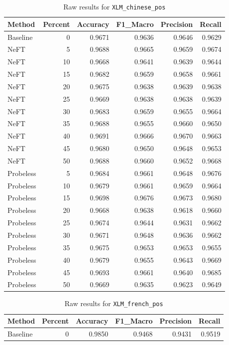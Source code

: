 \documentclass[12pt]{article}
\begin{document}
\begin{table}[H]
\centering
\caption{Raw results for \texttt{XLM\_chinese\_pos}}
\label{tab:xlm-chinese-pos}
\begin{tabular}{lrrrrr}
\toprule
Method & Percent & Accuracy & F1\_Macro & Precision & Recall \\
\midrule
Baseline & 0 & 0.9671 & 0.9636 & 0.9646 & 0.9629 \\
NeFT & 5 & 0.9688 & 0.9665 & 0.9659 & 0.9674 \\
NeFT & 10 & 0.9668 & 0.9641 & 0.9639 & 0.9644 \\
NeFT & 15 & 0.9682 & 0.9659 & 0.9658 & 0.9661 \\
NeFT & 20 & 0.9675 & 0.9638 & 0.9639 & 0.9638 \\
NeFT & 25 & 0.9669 & 0.9638 & 0.9638 & 0.9639 \\
NeFT & 30 & 0.9683 & 0.9659 & 0.9655 & 0.9664 \\
NeFT & 35 & 0.9688 & 0.9655 & 0.9660 & 0.9650 \\
NeFT & 40 & 0.9691 & 0.9666 & 0.9670 & 0.9663 \\
NeFT & 45 & 0.9680 & 0.9650 & 0.9648 & 0.9653 \\
NeFT & 50 & 0.9688 & 0.9660 & 0.9652 & 0.9668 \\
Probeless & 5 & 0.9684 & 0.9661 & 0.9648 & 0.9676 \\
Probeless & 10 & 0.9679 & 0.9661 & 0.9659 & 0.9664 \\
Probeless & 15 & 0.9698 & 0.9676 & 0.9673 & 0.9680 \\
Probeless & 20 & 0.9668 & 0.9638 & 0.9618 & 0.9660 \\
Probeless & 25 & 0.9674 & 0.9644 & 0.9631 & 0.9662 \\
Probeless & 30 & 0.9671 & 0.9648 & 0.9636 & 0.9662 \\
Probeless & 35 & 0.9675 & 0.9653 & 0.9653 & 0.9655 \\
Probeless & 40 & 0.9679 & 0.9655 & 0.9643 & 0.9669 \\
Probeless & 45 & 0.9693 & 0.9661 & 0.9640 & 0.9685 \\
Probeless & 50 & 0.9669 & 0.9635 & 0.9623 & 0.9649 \\
\bottomrule
\end{tabular}
\end{table}

\begin{table}[H]
\centering
\caption{Raw results for \texttt{XLM\_french\_pos}}
\label{tab:xlm-french-pos}
\begin{tabular}{lrrrrr}
\toprule
Method & Percent & Accuracy & F1\_Macro & Precision & Recall \\
\midrule
Baseline & 0 & 0.9850 & 0.9468 & 0.9431 & 0.9519 \\
\bottomrule
\end{tabular}
\end{table}
\end{document}
